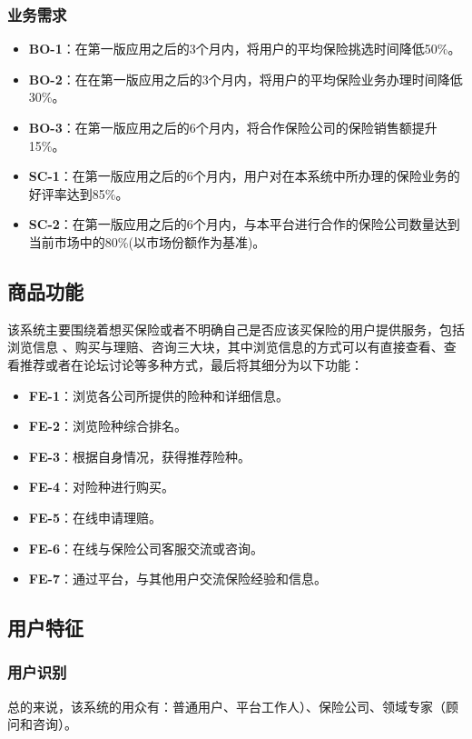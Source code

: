 \documentclass[a4paper]{ctexart}
\begin{document}
\subsubsection{业务需求}

\begin{itemize}
  \item \textbf{BO-1}：在第一版应用之后的3个月内，将用户的平均保险挑选时间降低50\%。
  \item \textbf{BO-2}：在在第一版应用之后的3个月内，将用户的平均保险业务办理时间降低30\%。
  \item \textbf{BO-3}：在第一版应用之后的6个月内，将合作保险公司的保险销售额提升15\%。
  \item \textbf{SC-1}：在第一版应用之后的6个月内，用户对在本系统中所办理的保险业务的好评率达到85\%。
  \item \textbf{SC-2}：在第一版应用之后的6个月内，与本平台进行合作的保险公司数量达到当前市场中的80\%(以市场份额作为基准)。
\end{itemize}

\subsection{商品功能}

该系统主要围绕着想买保险或者不明确自己是否应该买保险的用户提供服务，包括浏览信息 、购买与理赔、咨询三大块，其中浏览信息的方式可以有直接查看、查看推荐或者在论坛讨论等多种方式，最后将其细分为以下功能：

\begin{itemize}
  \item \textbf{FE-1}：浏览各公司所提供的险种和详细信息。
  \item \textbf{FE-2}：浏览险种综合排名。
  \item \textbf{FE-3}：根据自身情况，获得推荐险种。
  \item \textbf{FE-4}：对险种进行购买。
  \item \textbf{FE-5}：在线申请理赔。
  \item \textbf{FE-6}：在线与保险公司客服交流或咨询。
  \item \textbf{FE-7}：通过平台，与其他用户交流保险经验和信息。
\end{itemize}

\subsection{用户特征}

\subsubsection{用户识别} 总的来说，该系统的用众有：普通用户、平台工作人）、保险公司、领域专家（顾问和咨询）。
\end{document}
